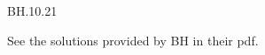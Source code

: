 

\setcounter{theorem}{20}
\begin{exercise} BH.10.21
\begin{solution}
See the solutions provided by BH in their pdf.

\end{solution}
\end{exercise}




